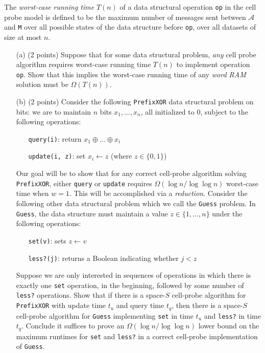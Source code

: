 \documentclass[12pt]{article}
\begin{document}
The {\em worst-case running time} $T(n)$ of a data structural operation \texttt{op} in the cell probe model is defined to be the maximum number of messages sent between $\mathcal{A}$ and \texttt{M} over all possible states of the data structure before \texttt{op}, over all datasets of size at most $n$.

\begin{itemize}
\item[(a)] (2 points) Suppose that for some data structural problem, {\em any} cell probe algorithm requires worst-case running time $T(n)$ to implement operation \texttt{op}. Show that this implies the worst-case running time of any {\em word RAM} solution must be $\Omega(T(n))$.
\item[(b)] (2 points) Consider the following \texttt{PrefixXOR} data structural problem on bits: we are to maintain $n$ bits $x_1,\ldots,x_n$, all initialized to $0$, subject to the following operations:
\begin{itemize}
\item[\textbullet] \texttt{query(i)}: return $x_1 \oplus \ldots \oplus x_i$
\item[\textbullet] \texttt{update(i, z)}: set $x_i\leftarrow z$ (where $z\in\{0,1\}$)
\end{itemize}
Our goal will be to show that for any correct cell-probe algorithm solving \texttt{PrefixXOR}, either \texttt{query} or \texttt{update} requires $\Omega(\log n/\log\log n)$ worst-case time when $w = 1$. This will be accomplished via a {\em reduction}. Consider the following other data structural problem which we call the \texttt{Guess} problem. In \texttt{Guess}, the data structure must maintain a value $z\in\{1,\ldots,n\}$ under the following operations:
\begin{itemize}
\item[\textbullet] \texttt{set(v)}: sets $z\leftarrow v$
\item[\textbullet] \texttt{less?(j)}: returns a Boolean indicating whether $j < z$
\end{itemize}
Suppose we are only interested in sequences of operations in which there is exactly one \texttt{set} operation, in the beginning, followed by some number of \texttt{less?} operations. Show that if there is a space-$S$ cell-probe algorithm for \texttt{PrefixXOR} with update time $t_u$ and query time $t_q$, then there is a space-$S$ cell-probe algorithm for \texttt{Guess} implementing \texttt{set} in time $t_u$ and \texttt{less?} in time $t_q$. Conclude it suffices to prove an $\Omega(\log n/\log\log n)$ lower bound on the maximum runtimes for \texttt{set} and \texttt{less?} in a correct cell-probe implementation of \texttt{Guess}.

\end{itemize}
\end{document}
